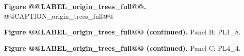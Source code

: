 \clearpage
{\large\textbf{Figure @@LABEL_origin_trees_full@@.} @@CAPTION_origin_trees_full@@\par}
{\textbf{Figure @@LABEL_origin_trees_full@@ (continued).} Panel B: PL1\_8.\par}
{\textbf{Figure @@LABEL_origin_trees_full@@ (continued).} Panel C: PL4\_4.\par}



